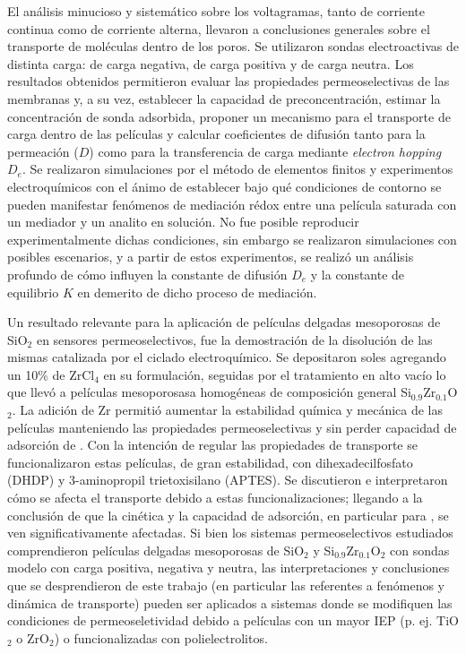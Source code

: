 El análisis minucioso y sistemático sobre los voltagramas, tanto de corriente continua como de corriente alterna, llevaron a conclusiones generales sobre el transporte de moléculas dentro de los poros. Se utilizaron sondas electroactivas de distinta carga: \ferroferri\space de carga negativa, \aminorutenio\space de carga positiva y \ferroceno\space de carga neutra. Los resultados obtenidos permitieron evaluar las propiedades permeoselectivas de las membranas y, a su vez, establecer la capacidad de preconcentración, estimar la concentración de sonda adsorbida, proponer un mecanismo para el transporte de carga dentro de las películas y calcular coeficientes de difusión tanto para la permeación ($D$) como para la transferencia de carga mediante \textit{electron hopping} $D_e$.
Se realizaron simulaciones por el método de elementos finitos y experimentos electroquímicos con el ánimo de establecer bajo qué condiciones de contorno se pueden manifestar fenómenos de mediación rédox entre una película saturada con un mediador y un analito en solución. No fue posible reproducir experimentalmente dichas condiciones, sin embargo se realizaron simulaciones con posibles escenarios, y a partir de estos experimentos, se realizó un análisis profundo de cómo influyen la constante de difusión $D_e$ y la constante de equilibrio $K$ en demerito de dicho proceso de mediación. 

Un resultado relevante para la aplicación de películas delgadas mesoporosas de SiO$_2$ en sensores permeoselectivos, fue la demostración de la disolución de las mismas  catalizada por el ciclado electroquímico. Se depositaron soles agregando un 10\% de  ZrCl$_4$ en su formulación, seguidas por el tratamiento en alto vacío lo que llevó a películas mesoporosasa homogéneas de composición general Si$_{0.9}$Zr$_{0.1}$O$_2$. La adición de Zr permitió aumentar la estabilidad química y mecánica de las películas manteniendo las propiedades permeoselectivas y sin perder capacidad de adsorción de \aminorutenio. Con la intención de regular las propiedades de transporte se funcionalizaron estas películas, de gran estabilidad, con dihexadecilfosfato (DHDP) y 3-aminopropil trietoxisilano (APTES). Se discutieron e interpretaron cómo se afecta el transporte debido a estas funcionalizaciones; llegando a la conclusión de que la cinética y la capacidad de adsorción, en particular para \ru, se ven significativamente afectadas. Si bien los sistemas permeoselectivos estudiados comprendieron películas delgadas mesoporosas de SiO$_2$ y Si$_{0.9}$Zr$_{0.1}$O$_2$ 
con sondas modelo con carga positiva, negativa y neutra, las interpretaciones y conclusiones que se desprendieron de este trabajo (en particular las referentes a  fenómenos y dinámica de transporte) pueden ser aplicados a sistemas donde se modifiquen las condiciones de permeoseletividad debido a películas con un mayor IEP (p. ej. TiO$_2$ o ZrO$_2$) o funcionalizadas con polielectrolitos. 
 
